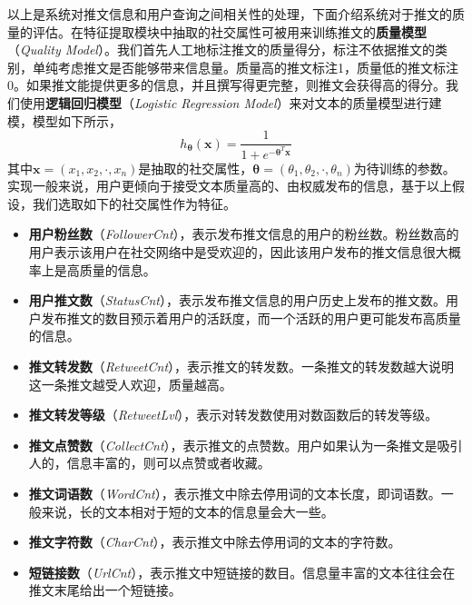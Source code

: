 以上是系统对推文信息和用户查询之间相关性的处理，下面介绍系统对于推文的质量的评估。在特征提取模块中抽取的社交属性可被用来训练推文的\textbf{质量模型}（\textit{Quality Model}）。我们首先人工地标注推文的质量得分，标注不依据推文的类别，单纯考虑推文是否能够带来信息量。质量高的推文标注1，质量低的推文标注0。如果推文能提供更多的信息，并且撰写得更完整，则推文会获得高的得分。我们使用\textbf{逻辑回归模型}（\textit{Logistic Regression Model}）来对文本的质量模型进行建模，模型如下所示，
\begin{equation}
\label{eq:lr}
  h_ {\bm{\theta}} \left(\mathbf{x}\right) = \frac{1}{1 + e^{-{{\bm{\theta}}^T}\mathbf{x}}}
\end{equation}
其中$\mathbf{x}=\left({x_1},{x_2},\cdot,{x_n}\right)$是抽取的社交属性，$\bm{\theta}=\left({\theta _1},{\theta _2},\cdot,{\theta _n}\right)$为待训练的参数。实现一般来说，用户更倾向于接受文本质量高的、由权威发布的信息，基于以上假设，我们选取如下的社交属性作为特征。
\begin{itemize}
  \item \textbf{用户粉丝数}（\textit{FollowerCnt}），表示发布推文信息的用户的粉丝数。粉丝数高的用户表示该用户在社交网络中是受欢迎的，因此该用户发布的推文信息很大概率上是高质量的信息。
  \item \textbf{用户推文数}（\textit{StatusCnt}），表示发布推文信息的用户历史上发布的推文数。用户发布推文的数目预示着用户的活跃度，而一个活跃的用户更可能发布高质量的信息。
  \item \textbf{推文转发数}（\textit{RetweetCnt}），表示推文的转发数。一条推文的转发数越大说明这一条推文越受人欢迎，质量越高。
  \item \textbf{推文转发等级}（\textit{RetweetLvl}），表示对转发数使用对数函数后的转发等级。
  \item \textbf{推文点赞数}（\textit{CollectCnt}），表示推文的点赞数。用户如果认为一条推文是吸引人的，信息丰富的，则可以点赞或者收藏。
  \item \textbf{推文词语数}（\textit{WordCnt}），表示推文中除去停用词的文本长度，即词语数。一般来说，长的文本相对于短的文本的信息量会大一些。
  \item \textbf{推文字符数}（\textit{CharCnt}），表示推文中除去停用词的文本的字符数。
  \item \textbf{短链接数}（\textit{UrlCnt}），表示推文中短链接的数目。信息量丰富的文本往往会在推文末尾给出一个短链接。
\end{itemize}

